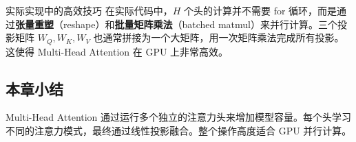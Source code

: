 \begin{knowledgebox}{实际实现中的高效技巧}
在实际代码中，$H$ 个头的计算并不需要 for 循环，而是通过\textbf{张量重塑}（reshape）和\textbf{批量矩阵乘法}（batched matmul）来并行计算。三个投影矩阵 $W_Q, W_K, W_V$ 也通常拼接为一个大矩阵，用一次矩阵乘法完成所有投影。这使得 Multi-Head Attention 在 GPU 上非常高效。
\end{knowledgebox}

\subsection{本章小结}

Multi-Head Attention 通过运行多个独立的注意力头来增加模型容量。每个头学习不同的注意力模式，最终通过线性投影融合。整个操作高度适合 GPU 并行计算。


